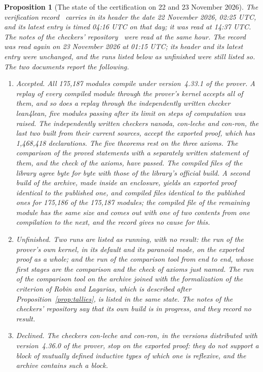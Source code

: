 \documentclass[11pt]{article}
\newtheorem{proposition}[theorem]{Proposition}
\theoremstyle{definition}
\theoremstyle{remark}
\begin{document}
\begin{proposition}[The state of the certification on 22 and 23 November 2026]\label{prop:state}
The verification record~\citep{sutherland} carries in its header the date 22 November 2026, 02:25 UTC, and its latest entry is timed 04:16 UTC on that day; it was read at 14:37 UTC. The notes of the checkers' repository~\citep{leannotes} were read at the same hour. The record was read again on 23 November 2026 at 01:15 UTC; its header and its latest entry were unchanged, and the runs listed below as unfinished were still listed so. The two documents report the following.
\begin{enumerate}[leftmargin=2em,itemsep=1pt]
\item \emph{Accepted.} All 175{,}187 modules compile under version~4.33.1 of the prover. A replay of every compiled module through the prover's kernel accepts all of them, and so does a replay through the independently written checker lean4lean, five modules passing after its limit on steps of computation was raised. The independently written checkers nanoda, con-leche and con-ron, the last two built from their current sources, accept the exported proof, which has 1{,}468{,}418 declarations. The five theorems rest on the three axioms. The comparison of the proved statements with a separately written statement of them, and the check of the axioms, have passed. The compiled files of the library agree byte for byte with those of the library's official build. A second build of the archive, made inside an enclosure, yields an exported proof identical to the published one, and compiled files identical to the published ones for 175{,}186 of the 175{,}187 modules; the compiled file of the remaining module has the same size and comes out with one of two contents from one compilation to the next, and the record gives no cause for this.
\item \emph{Unfinished.} Two runs are listed as running, with no result: the run of the prover's own kernel, in its default and its paranoid mode, on the exported proof as a whole; and the run of the comparison tool from end to end, whose first stages are the comparison and the check of axioms just named. The run of the comparison tool on the archive joined with the formalization of the criterion of Robin and Lagarias, which is described after Proposition~\ref{prop:tallies}, is listed in the same state. The notes of the checkers' repository say that its own build is in progress, and they record no result.
\item \emph{Declined.} The checkers con-leche and con-ron, in the versions distributed with version~4.36.0 of the prover, stop on the exported proof: they do not support a block of mutually defined inductive types of which one is reflexive, and the archive contains such a block.

\end{enumerate}
\end{proposition}
\end{document}
